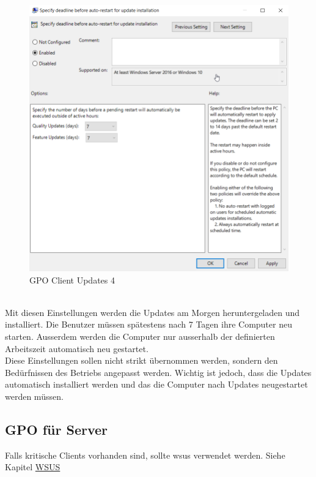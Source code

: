 \begin{minipage}{0.5\linewidth}
    \begin{figure}[H]
        \centering
        \includegraphics[width=\linewidth]{../img/Updates/client-force-restart-deadline.png}
        \caption{GPO Client Updates 4}
    \end{figure}
\end{minipage}\\

Mit diesen Einstellungen werden die Updates am Morgen heruntergeladen und installiert.
Die Benutzer müssen spätestens nach 7 Tagen ihre Computer neu starten.
Ausserdem werden die Computer nur ausserhalb der definierten Arbeitszeit automatisch neu gestartet.\\

Diese Einstellungen sollen nicht strikt übernommen werden, sondern den Bedürfnissen des Betriebs angepasst werden.
Wichtig ist jedoch, dass die Updates automatisch installiert werden und das die Computer nach Updates neugestartet werden müssen.

\subsection{GPO für Server}
Falls kritische Clients vorhanden sind, sollte \acrfull{wsus} verwendet werden. Siehe Kapitel \hyperref[subsec:wsus]{WSUS}\\

